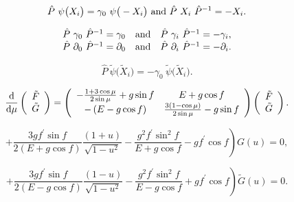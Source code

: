 \documentclass[]{article}
\begin{document}
	\begin{equation}
		{\hat P}~ \psi\big(X_i \big) = \gamma_0~ \psi \big( - X_i \big)\
		{\rm and}\ {\hat P}~ X_i~ {\hat P}^{-1} = - X_i. 
	\end{equation}
	
	\begin{eqnarray} 
		\begin{array}{ccc}
			{\hat P}~ \gamma_0~ {\hat P}^{-1} = \gamma_0 & {\rm and} & 
			{\hat P}~ \gamma_i~ {\hat P}^{-1} = - \gamma_i, \\
			{\hat P}~ \partial_0~ {\hat P}^{-1} = \partial_0 & {\rm and} &
			{\hat P}~ \partial_i~ {\hat P}^{-1} = - \partial_i. 
		\end{array}
	\end{eqnarray}
	
	\begin{equation}
		{\hat P}~ {\tilde \psi}\big({\tilde X}_i\big) = 
		- \gamma_0~ {\tilde \psi}\big({\tilde X}_i\big).
	\end{equation}
	


	
     \begin{eqnarray}
		\label{general2}
		\frac{{\rm d}}{{\rm {d}} \mu}
		\left(
		\begin{array}{c}
			{\tilde F} \\
			{\tilde G}
		\end{array}
		\right) = \left(
		\begin{array}{cc}
			- \frac{1 + 3 \cos \mu}{2 \sin \mu} + g \sin f & E + g \cos f \\
			- \left(E - g \cos f \right) & 
			\frac{3 \left(1 - \cos \mu \right)}{2 \sin \mu} - g \sin f
		\end{array}
		\right) \left(
		\begin{array}{c}
			{\tilde F} \\
			{\tilde G}
		\end{array}
		\right).
	\end{eqnarray}
	



\begin{equation}
	\label{OD1}
	\left.
	+ \frac{3 g f^{\prime} \sin f}{2 \left(E + g \cos f \right)} 
	\frac{(1+u)}{\sqrt{1-u^2}} 
	- \frac{g^2 f^\prime \sin^2 f}{E + g \cos f} - g f^\prime \cos f
	\right) G(u) = 0, 
\end{equation}



\begin{equation}
	\label{OD2}
	\left.
	+ \frac{3 g f^\prime \sin f}{2 \left(E - g \cos f \right)} 
	\frac{(1-u)}{\sqrt{1-u^2}} 
	- \frac{g^2 f^\prime \sin^2 f}{E - g \cos f} + g f^\prime \cos f
	\right) {\tilde G}(u) = 0. 
\end{equation}
\end{document}
